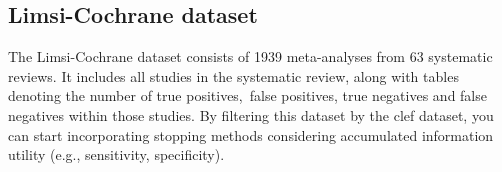\documentclass[10pt,oneside]{book}
\begin{document}
\subsection{Limsi-Cochrane dataset}
The Limsi-Cochrane dataset consists of 1939 meta-analyses from 63 systematic reviews\cite{norman_cochrane_2018}. It includes all studies in the systematic review, along with tables denoting the number of true positives, false positives, true negatives and false negatives within those studies. By filtering this dataset by the \gls*{clef} dataset, you can start incorporating stopping methods considering accumulated information utility (e.g., sensitivity, specificity). 




\end{document}
